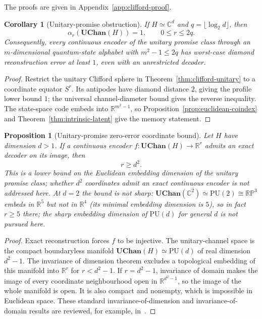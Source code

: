 \documentclass[11pt,a4paper]{article}
\theoremstyle{definition}
\theoremstyle{plain}
\newtheorem{proposition}[theorem]{Proposition}
\newtheorem{corollary}[theorem]{Corollary}
\theoremstyle{remark}
\newcommand{\UChan}{\mathbf{UChan}}
\begin{document}
The proofs are given in Appendix~\ref{app:clifford-proof}.


\begin{corollary}[Unitary-promise obstruction]
\label{cor:unitary-promise}
If $H\simeq\mathbb C^d$ and $q=\lfloor\log_2d\rfloor$, then
\[
\alpha_r(\UChan(H))=1,
\qquad0\leq r\leq2q.
\]
Consequently, every continuous encoder of the unitary promise class through
an $m$-dimensional quantum-state alphabet with $m^2-1\leq2q$ has worst-case
diamond reconstruction error at least $1$, even with an unrestricted
decoder.
\end{corollary}

\begin{proof}
Restrict the unitary Clifford sphere in Theorem~\ref{thm:clifford-unitary} to a
coordinate equator $S^r$. Its antipodes have diamond distance $2$, giving
the profile lower bound $1$; the universal channel-diameter bound gives the
reverse inequality. The state-space code embeds into
$\mathbb R^{m^2-1}$, so Proposition~\ref{prop:euclidean-coindex} and
Theorem~\ref{thm:intrinsic-latent} give the memory statement.
\end{proof}

\begin{proposition}[Unitary-promise zero-error coordinate bound]
\label{prop:unitary-coordinate-bound}
Let $H$ have dimension $d>1$. If a continuous encoder
$f:\UChan(H)\to\mathbb R^r$ admits an exact decoder on its image, then
\[
r\geq d^2.
\]
This is a lower bound on the Euclidean embedding dimension of the unitary promise class; whether $d^2$ coordinates admit an exact continuous encoder is not addressed here. At $d=2$ the bound is not sharp: $\UChan(\mathbb C^2)\simeq\mathrm{PU}(2)\cong\mathbb{RP}^3$ embeds in $\mathbb R^5$ but not in $\mathbb R^4$ (its minimal embedding dimension is $5$), so in fact $r\geq5$ there; the sharp embedding dimension of $\mathrm{PU}(d)$ for general $d$ is not pursued here.
\end{proposition}

\begin{proof}
Exact reconstruction forces $f$ to be injective. The unitary-channel space
is the compact boundaryless manifold
$\UChan(H)\simeq\mathrm{PU}(d)$ of real dimension $d^2-1$. The invariance
of dimension theorem excludes a topological embedding of this manifold into
$\mathbb R^r$ for $r<d^2-1$. If $r=d^2-1$, invariance of domain makes the
image of every coordinate
neighbourhood open in $\mathbb R^{d^2-1}$, so the image of the whole manifold
is open. It is also compact and nonempty, which is impossible in Euclidean
space. These standard invariance-of-dimension and invariance-of-domain
results are reviewed, for example, in~\cite{Munkres2000}.
\end{proof}
\end{document}
